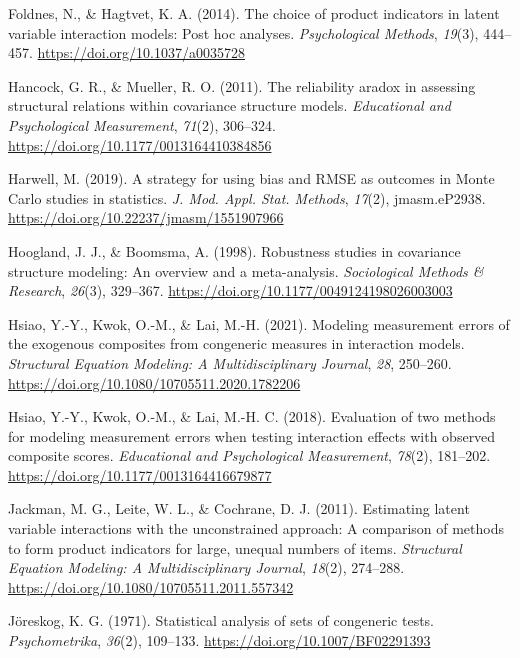 \documentclass[
  man,mask]{apa6}
\newlength{\cslhangindent}
\newenvironment{CSLReferences}[2] %
 {\begin{list}{}{%
  \setlength{\itemindent}{0pt}
  \setlength{\leftmargin}{0pt}
  \setlength{\parsep}{0pt}
  \ifodd #1
   \setlength{\leftmargin}{\cslhangindent}
   \setlength{\itemindent}{-1\cslhangindent}
  \fi
  \setlength{\itemsep}{#2\baselineskip}}}
 {\end{list}}
\begin{document}
\begin{CSLReferences}{1}{0}
Foldnes, N., \& Hagtvet, K. A. (2014). The choice of product indicators in latent variable interaction models: {Post} hoc analyses. \emph{Psychological Methods}, \emph{19}(3), 444--457. \url{https://doi.org/10.1037/a0035728}

Hancock, G. R., \& Mueller, R. O. (2011). The reliability aradox in assessing structural relations within covariance structure models. \emph{Educational and Psychological Measurement}, \emph{71}(2), 306--324. \url{https://doi.org/10.1177/0013164410384856}

Harwell, M. (2019). A strategy for using bias and {RMSE} as outcomes in {Monte Carlo} studies in statistics. \emph{J. Mod. Appl. Stat. Methods}, \emph{17}(2), jmasm.eP2938. \url{https://doi.org/10.22237/jmasm/1551907966}

Hoogland, J. J., \& Boomsma, A. (1998). Robustness studies in covariance structure modeling: {An} overview and a meta-analysis. \emph{Sociological Methods \& Research}, \emph{26}(3), 329--367. \url{https://doi.org/10.1177/0049124198026003003}

Hsiao, Y.-Y., Kwok, O.-M., \& Lai, M.-H. (2021). Modeling measurement errors of the exogenous composites from congeneric measures in interaction models. \emph{Structural Equation Modeling: A Multidisciplinary Journal}, \emph{28}, 250--260. \url{https://doi.org/10.1080/10705511.2020.1782206}

Hsiao, Y.-Y., Kwok, O.-M., \& Lai, M.-H. C. (2018). Evaluation of two methods for modeling measurement errors when testing interaction effects with observed composite scores. \emph{Educational and Psychological Measurement}, \emph{78}(2), 181--202. \url{https://doi.org/10.1177/0013164416679877}

Jackman, M. G., Leite, W. L., \& Cochrane, D. J. (2011). Estimating latent variable interactions with the unconstrained approach: A comparison of methods to form product indicators for large, unequal numbers of items. \emph{Structural Equation Modeling: A Multidisciplinary Journal}, \emph{18}(2), 274--288. \url{https://doi.org/10.1080/10705511.2011.557342}

Jöreskog, K. G. (1971). Statistical analysis of sets of congeneric tests. \emph{Psychometrika}, \emph{36}(2), 109--133. \url{https://doi.org/10.1007/BF02291393}


\end{CSLReferences}
\end{document}
